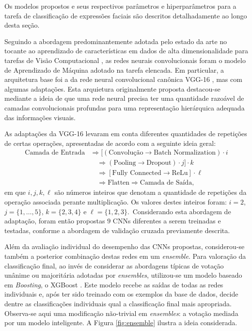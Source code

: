 Os modelos propostos e seus respectivos parâmetros e hiperparâmetros para a tarefa de classificação de expressões faciais são descritos detalhadamente ao longo desta seção.

Seguindo a abordagem predominantemente adotada pelo estado da arte no tocante ao aprendizado de características em dados de alta dimensionalidade para tarefas de Visão Computacional \cite{Khan:Livro}, as redes neurais convolucionais foram o modelo de Aprendizado de Máquina adotado na tarefa elencada. Em particular, a arquitetura base foi a da rede neural convolucional canônica VGG-16 \cite{VGG}, mas com algumas adaptações. Esta arquietura originalmente proposta  destacou-se mediante a ideia de que uma rede neural precisa ter uma quantidade razoável  de camadas convolucionais profundas para uma representação hierárquica adequada das informações visuais.

As adaptações da VGG-16 levaram em conta diferentes quantidades de repetições de certas operações, apresentadas de acordo com a seguinte ideia geral:
\begin{equation}
\begin{split}
\textrm{Camada de Entrada} & \Rightarrow [ (\textrm{Convolução} \rightarrow \textrm{Batch Normalization})\cdot i\\
 &\quad \Rightarrow (\textrm{Pooling} \rightarrow \textrm{Dropout})\cdot j]\cdot k \\
 &\quad \Rightarrow [\textrm{Fully Connected} \rightarrow \textrm{ReLu}]\cdot \ell \\
 &\quad \Rightarrow \textrm{Flatten} \Rightarrow \textrm{Camada de Saída},
\end{split}
\end{equation} em que $i, j, k, \ell$ são números inteiros que denotam a quantidade de repetições da operação associada perante multiplicação. Os valores destes inteiros foram: $i = 2$, $j = \{1, \ldots, 5\}$, $k = \{2, 3, 4\}$ e $\ell = \{ 1,2,3 \}$.\ Considerando esta abordagem de adaptação, foram então propostas $9$ CNNs diferentes a serem treinadas e testadas, conforme a abordagem de validação cruzada previamente descrita.


Além da avaliação individual do desempenho das CNNs propostas, considerou-se também a posterior combinação destas redes em um \emph{ensemble}. Para valoração da classificação final, ao invés de considerar as abordagens típicas de votação unânime ou majoritária adotadas por \emph{ensembles}, utilizou-se um modelo baseado em \emph{Boosting}, o XGBoost \cite{Chen:Boosting}. Este modelo recebe as saídas de todas as redes individuais e, após ter sido treinado com os exemplos da base de dados, decide dentre as classificações individuais qual a classificação final mais apropriada. Observa-se aqui uma modificação não-trivial em \emph{ensembles}: a votação mediada por um modelo inteligente. A Figura \ref{fig:ensemble} ilustra a ideia considerada.


